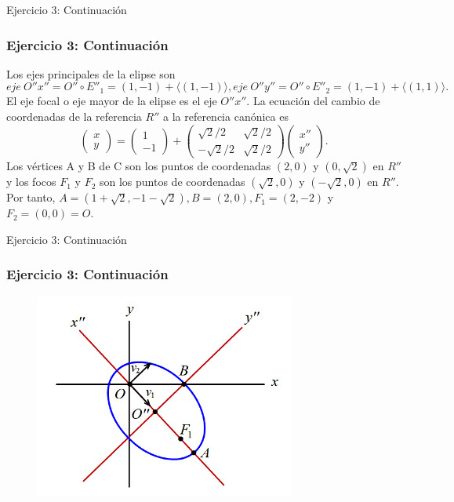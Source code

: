 \documentclass[xcolor={dvipsnames},aspectratio=169,10pt]{beamer}
\begin{document}
\begin{frame}{Ejercicio 3: Continuación}
  \frametitle{Ejercicio 3: Continuación}
    Los ejes principales de la elipse son
    \[eje\ O''x'' = O'' \circ E''_1 = (1, -1) + \langle(1, -1)\rangle, eje\ O''y'' = O'' \circ E''_2 = (1, -1) + \langle(1, 1)\rangle.\]
    El eje focal o eje mayor de la elipse es el eje $O''x''$. La ecuación del cambio de coordenadas de la referencia $R''$ a la referencia canónica es
    \[\begin{pmatrix} x \\ y \end{pmatrix} = \begin{pmatrix} 1 \\ -1 \end{pmatrix} + \begin{pmatrix} \sqrt{2}/2 & \sqrt{2}/2 \\ -\sqrt{2}/2 & \sqrt{2}/2 \end{pmatrix} \begin{pmatrix} x'' \\ y'' \end{pmatrix}.\]
    Los vértices A y B de C son los puntos de coordenadas $(2, 0)$ y $(0, \sqrt{2})$ en $R''$ y los focos $F_1$ y $F_2$ son los puntos de coordenadas $(\sqrt{2}, 0)$ y $(-\sqrt{2}, 0)$ en $R''$. Por tanto, $A = (1 + \sqrt{2}, -1 - \sqrt{2}), B = (2, 0), F_1 = (2, -2)$ y $F_2 = (0, 0) = O$.
\end{frame}

\begin{frame}{Ejercicio 3: Continuación}
  \frametitle{Ejercicio 3: Continuación}
  \begin{figure}
    \includegraphics[width=\textwidth, height=\textheight, keepaspectratio]{images/ej3.png}
  \end{figure}
\end{frame}
\end{document}
